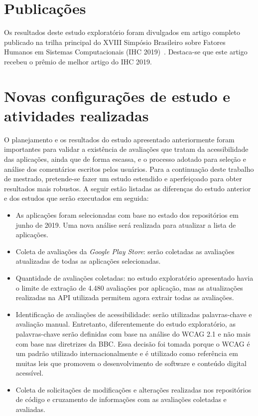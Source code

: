 \section{Publicações}

Os resultados deste estudo exploratório foram divulgados em artigo completo publicado na trilha principal do XVIII Simpósio Brasileiro sobre Fatores Humanos em Sistemas Computacionais (IHC 2019)~\cite{ihc2019}. Destaca-se que este artigo recebeu o prêmio de melhor artigo do IHC 2019. 

\section{Novas configurações de estudo e atividades realizadas}

O planejamento e os resultados do estudo apresentado anteriormente foram importantes para validar a existência de avaliações que tratam da acessibilidade das aplicações, ainda que de forma escassa, e o processo adotado para seleção e análise dos comentários escritos pelos usuários. 
Para a continuação deste trabalho de mestrado, pretende-se fazer um estudo estendido e aperfeiçoado para obter resultados mais robustos. A seguir estão listadas as diferenças do estudo anterior e dos estudos que serão executados em seguida:
\begin{itemize}
 \item As aplicações foram selecionadas com base no estado dos repositórios em junho de 2019. Uma nova análise será realizada para atualizar a lista de aplicações.
 \item Coleta de avaliações da \textit{Google Play Store}: serão coletadas as avaliações atualizadas de todas as aplicações selecionadas.
 \item Quantidade de avaliações coletadas: no estudo exploratório apresentado havia o limite de extração de 4.480 avaliações por aplicação, mas as atualizações realizadas na API utilizada permitem agora extrair todas as avaliações.
 \item Identificação de avaliações de acessibilidade: serão utilizadas palavras-chave e avaliação manual. Entretanto, diferentemente do estudo exploratório, as palavras-chave serão definidas com base na análise do WCAG 2.1 e não mais com base nas diretrizes da BBC. Essa decisão foi tomada porque o WCAG é um padrão utilizado internacionalmente e é utilizado como referência em muitas leis que promovem o desenvolvimento de software e conteúdo digital acessível. 
 \item Coleta de solicitações de modificações e alterações realizadas nos repositórios de código e cruzamento de informações com as avaliações coletadas e avaliadas.
 
\end{itemize}


